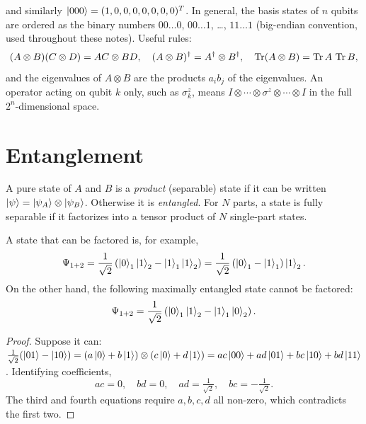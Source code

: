 and similarly $\left|000\right\rangle=(1,0,0,0,0,0,0,0)^T$. In general, the basis states of $n$ qubits are ordered as the binary numbers $00\dots0$, $00\dots1$, \dots, $11\dots1$
(big-endian convention, used throughout these notes). Useful rules:
\begin{equation}
  (A\otimes B)(C\otimes D)=AC\otimes BD,\quad(A\otimes B)^\dagger=A^\dagger\otimes B^\dagger,\quad\operatorname{Tr}(A\otimes B)=\operatorname{Tr} A\,\operatorname{Tr} B,
\end{equation}
and the eigenvalues of $A\otimes B$ are the products $a_ib_j$ of the eigenvalues. An operator acting on qubit $k$ only, such as $\sigma^z_k$, means
$I\otimes\cdots\otimes\sigma^z\otimes\cdots\otimes I$ in the full $2^n$-dimensional space.

\section{Entanglement}
\begin{definition}
A pure state of $A$ and $B$ is a \emph{product} (separable) state if it can be written $\left|\psi\right\rangle=\left|\psi_A\right\rangle\otimes\left|\psi_B\right\rangle$. Otherwise it is \emph{entangled}.
For $N$ parts, a state is fully separable if it factorizes into a tensor product of $N$ single-part states.
\end{definition}
A state that can be factored is, for example,
\begin{equation}
  \Psi_{1+2}=\frac1{\sqrt2}\left(\left|0\right\rangle_1\left|1\right\rangle_2-\left|1\right\rangle_1\left|1\right\rangle_2\right)=\frac1{\sqrt2}\left(\left|0\right\rangle_1-\left|1\right\rangle_1\right)\left|1\right\rangle_2 .
\end{equation}
On the other hand, the following maximally entangled state cannot be factored:
\begin{equation}\label{eq:singlet}
  \Psi_{1+2}=\frac1{\sqrt2}\left(\left|0\right\rangle_1\left|1\right\rangle_2-\left|1\right\rangle_1\left|0\right\rangle_2\right).
\end{equation}
\begin{proof}
Suppose it can: $\frac1{\sqrt2}(\left|01\right\rangle-\left|10\right\rangle)=(a\left|0\right\rangle+b\left|1\right\rangle)\otimes(c\left|0\right\rangle+d\left|1\right\rangle)=ac\left|00\right\rangle+ad\left|01\right\rangle+bc\left|10\right\rangle+bd\left|11\right\rangle$. Identifying coefficients,
\begin{equation}
  ac=0,\quad bd=0,\quad ad=\tfrac1{\sqrt2},\quad bc=-\tfrac1{\sqrt2}.
\end{equation}
The third and fourth equations require $a,b,c,d$ all non-zero, which contradicts the first two.
\end{proof}

